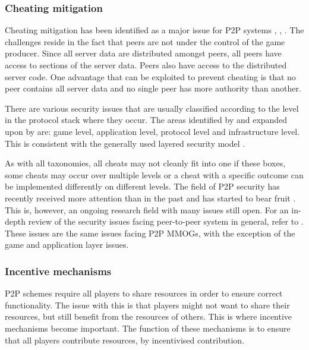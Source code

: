 \documentclass[10pt,a4paper,journal,cspaper,compsoc]{IEEEtran}
\begin{document}
\subsubsection{Cheating mitigation}
\label{key_challenges_cheating}

Cheating mitigation has been identified as a major issue for P2P systems \cite{knutsson_p2p_first}, \cite{challenges_p2p_gaming},
\cite{cheat_proof_event_ordering}. The challenges reside in the fact that peers are not under the control of the game producer. Since all server data
are distributed amongst peers, all peers have access to sections of the server data. Peers also have access to the distributed server code. One
advantage that can be exploited to prevent cheating is that no peer contains all server data and no single peer has more authority than another.

There are various security issues that are usually classified according to the level in the protocol stack where they occur. The areas identified by
\cite{cheat_proof_event_ordering} and expanded upon by \cite{cheating_taxonomy} are: game level, application level, protocol level and infrastructure
level. This is consistent with the generally used layered security model \cite{distributed_systems_security}.

As with all taxonomies, all cheats may not cleanly fit into one if these boxes, some cheats may occur over multiple levels or a cheat with a specific
outcome can be implemented differently on different levels. The field of P2P security has recently received more attention than in the past and has
started to bear fruit \cite{survey_p2p_game_cheats}. This is, however, an ongoing research field with many issues still open. For an in-depth review
of the security issues facing peer-to-peer system in general, refer to \cite{p2p_security_issues}. These issues are the same issues facing P2P MMOGs,
with the exception of the game and application layer issues.

\subsubsection{Incentive mechanisms}

P2P schemes require all players to share resources in order to ensure correct functionality. The issue with this is that players might not want to
share their resources, but still benefit from the resources of others. This is where incentive mechanisms become important. The function of these
mechanisms is to ensure that all players contribute resources, by incentivised contribution.
\end{document}
